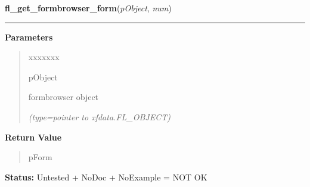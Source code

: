 \hspace{.8\funcindent}\begin{boxedminipage}{\funcwidth}

    \raggedright \textbf{fl\_get\_formbrowser\_form}(\textit{pObject}, \textit{num})

    \vspace{-1.5ex}

    \rule{\textwidth}{0.5\fboxrule}
\setlength{\parskip}{2ex}
\setlength{\parskip}{1ex}
      \textbf{Parameters}
      \vspace{-1ex}

      \begin{quote}
        \begin{Ventry}{xxxxxxx}

          \item[pObject]

          formbrowser object

            {\it (type=pointer to xfdata.FL\_OBJECT)}

        \end{Ventry}

      \end{quote}

      \textbf{Return Value}
    \vspace{-1ex}

      \begin{quote}
      pForm

      \end{quote}

\textbf{Status:} Untested + NoDoc + NoExample = NOT OK



    \end{boxedminipage}

    \label{xformslib:library:fl_add_frame}

    \vspace{0.5ex}

